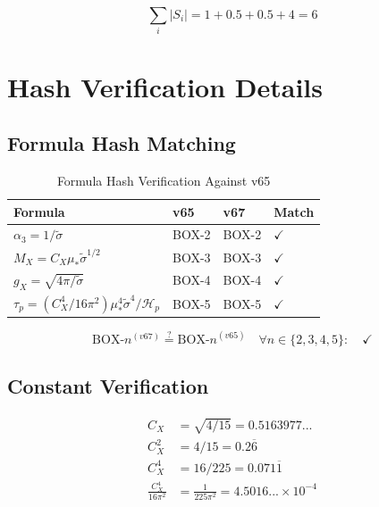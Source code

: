 \documentclass[11pt,letterpaper]{article}
\newcommand{\st}{\tilde{\sigma}}
\newcommand{\Hp}{\mathcal{H}_p}
\begin{document}
\begin{equation}
\sum_i |S_i| = 1 + 0.5 + 0.5 + 4 = 6
\label{eq:total-sensitivity}
\end{equation}

\section{Hash Verification Details}
\label{app:hash-verify}

\subsection{Formula Hash Matching}
\label{app:formula-hash}

\begin{table}[h!]
\centering
\caption{Formula Hash Verification Against v65}
\label{tab:formula-hash}
\begin{tabular}{llll}
\toprule
Formula & v65 & v67 & Match \\
\midrule
$\alpha_3 = 1/\st$ & BOX-2 & BOX-2 & $\checkmark$ \\
$M_X = C_X \mu_* \st^{1/2}$ & BOX-3 & BOX-3 & $\checkmark$ \\
$g_X = \sqrt{4\pi/\st}$ & BOX-4 & BOX-4 & $\checkmark$ \\
$\tau_p = (C_X^4/16\pi^2) \mu_*^4 \st^4/\Hp$ & BOX-5 & BOX-5 & $\checkmark$ \\
\bottomrule
\end{tabular}
\end{table}

\begin{equation}
\text{BOX-}n^{(v67)} \stackrel{?}{=} \text{BOX-}n^{(v65)} \quad \forall n \in \{2,3,4,5\}: \quad \checkmark
\label{eq:box-verify}
\end{equation}

\subsection{Constant Verification}
\label{app:const-verify}

\begin{align}
C_X &= \sqrt{4/15} = 0.5163977... \label{eq:cx-verify} \\
C_X^2 &= 4/15 = 0.2\overline{6} \label{eq:cx2-verify} \\
C_X^4 &= 16/225 = 0.071\overline{1} \label{eq:cx4-verify} \\
\frac{C_X^4}{16\pi^2} &= \frac{1}{225\pi^2} = 4.5016... \times 10^{-4} \label{eq:prefactor-verify}
\end{align}
\end{document}
